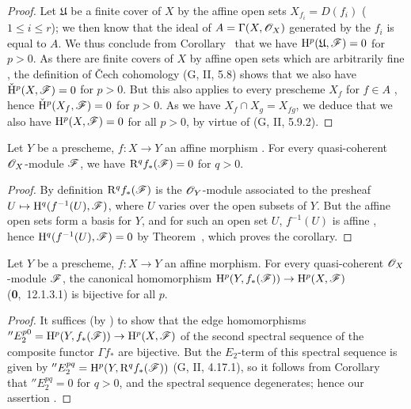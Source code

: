 \begin{proof}
Let $\mathfrak{U}$ be a finite cover of $X$ by the affine open sets $X_{f_i}=D(f_i)$ ($1\leq i\leq r$); we then know that the ideal of $A=\Gamma(X,\mathscr{O}_X)$ generated by the $f_i$ is equal to $A$.
We thus conclude from Corollary~ that we have $\mathrm{H}^p(\mathfrak{U},\mathscr{F})=0$ for $p>0$.
As there are finite covers of $X$ by affine open sets which are arbitrarily fine , the definition of \v Cech cohomology (G, II, 5.8) shows that we also have $\check{\mathrm{H}}^p(X,\mathscr{F})=0$ for $p>0$.
But this also applies to every prescheme $X_f$ for $f\in A$ , hence $\check{\mathrm{H}}^p(X_f,\mathscr{F})=0$ for $p>0$.
As we have $X_f\cap X_g=X_{fg}$, we deduce that we also have $\mathrm{H}^p(X,\mathscr{F})=0$ for all $p>0$, by virtue of (G, II, 5.9.2).
\end{proof}

\begin{corollary}[1.3.2]
\label{III.1.3.2}
Let $Y$ be a prescheme, $f:X\to Y$ an affine morphism .
For every quasi-coherent $\mathscr{O}_X$-module $\mathscr{F}$, we have $\mathrm{R}^q f_*(\mathscr{F})=0$ for $q>0$.
\end{corollary}

\begin{proof}
By definition $\mathrm{R}^q f_*(\mathscr{F})$ is the $\mathscr{O}_Y$-module associated to the presheaf $U\mapsto\HH^q(f^{-1}(U),\sh{F})$, where $U$ varies over the open subsets of $Y$.
But the affine open sets form a basis for $Y$, and for such an open set $U$, $f^{-1}(U)$ is affine , hence $\mathrm{H}^q(f^{-1}(U),\mathscr{F})=0$ by Theorem~, which proves the corollary.
\end{proof}

\begin{corollary}[1.3.3]
\label{III.1.3.3}
Let $Y$ be a prescheme, $f:X\to Y$ an affine morphism.
For every quasi-coherent $\mathscr{O}_X$-module $\mathscr{F}$, the canonical homomorphism $\HH^p(Y,f_*(\sh{F}))\to\HH^p(X,\sh{F})$ (\textbf{0},~12.1.3.1) is bijective for all $p$.
\end{corollary}

\begin{proof}
It suffices (by ) to show that the edge homomorphisms $''E_2^{p0}=\HH^p(Y,f_*(\sh{F}))\to\HH^p(X,\sh{F})$ of the second spectral sequence of the composite functor $\Gamma f_*$ are bijective.
But the $E_2$-term of this spectral sequence is given by $''E_2^{pq}=\mathrm{H}^p(Y,\mathrm{R}^q f_*(\mathscr{F}))$ (G, II, 4.17.1), so it follows from Corollary~ that $''E_2^{pq}=0$ for $q>0$, and the spectral sequence degenerates; hence our assertion .
\end{proof}

